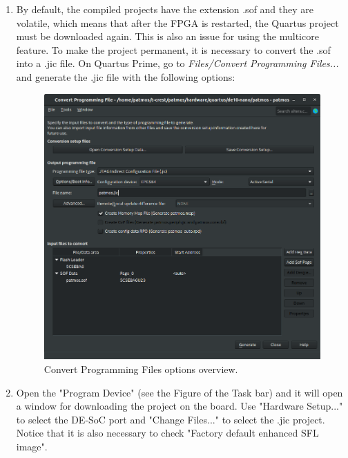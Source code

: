 \begin{enumerate}
    \item By default, the compiled projects have the extension .sof and they are volatile, which means that after the FPGA is restarted, the Quartus project must be downloaded again. This is also an issue for using the multicore feature. To make the project permanent, it is necessary to convert the .sof into a .jic file. On Quartus Prime, go to \textit{Files/Convert Programming Files...} and generate the .jic file with the following options:
    
\begin{figure}[H]
    \centering
        \includegraphics[width=\textwidth]{Figures/setup/quartus_create_jic.png}
    \caption{Convert Programming Files options overview.}\label{fig:app_jic}
\end{figure}    
    
    \item Open the "Program Device" (see the Figure of the Task bar) and it will open a window for downloading the project on the board. Use "Hardware Setup..." to select the DE-SoC port and "Change Files..." to select the .jic project. Notice that it is also necessary to check "Factory default enhanced SFL image".


\end{enumerate}
